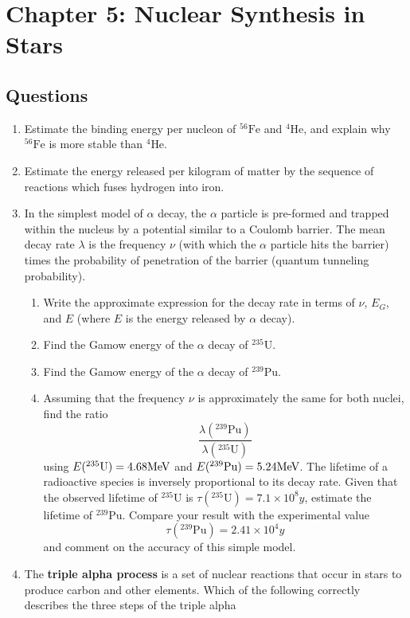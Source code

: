 \section{Chapter 5: Nuclear Synthesis in Stars}

\subsection{Questions}
\begin{enumerate}[label=5.\arabic*]
    \item Estimate the binding energy per nucleon of $^{56}\text{Fe}$ and $^4\text{He}$, and explain why $^{56}\text{Fe}$ is more stable than $^4\text{He}$. 
    \item Estimate the energy released per kilogram of matter by the sequence of reactions which fuses hydrogen into iron.
    \item  In the simplest model of $\alpha$ decay, the $\alpha$ particle is pre-formed and trapped within the nucleus by a potential similar to a Coulomb barrier. The mean decay rate $\lambda$ is the frequency $\nu$ 
    (with which the $\alpha$ particle hits the barrier) times the probability of penetration of the barrier (quantum tunneling probability).
        \begin{enumerate}[label=(\alph*)]
            \item Write the approximate expression for the decay rate in terms of $\nu$, $E_G$, and $E$ (where $E$ is the energy released by $\alpha$ decay).
            \item Find the Gamow energy of the $\alpha$ decay of $^{235}\text{U}$.
            \item Find the Gamow energy of the $\alpha$ decay of $^{239}\text{Pu}$.
            \item Assuming that the frequency $\nu$ is approximately the same for both nuclei, find the ratio
           \[ \frac{\lambda(^{239}\text{Pu})}{\lambda(^{235}\text{U})} \]
           using $E(^{235}\text{U}) = 4.68 \textup{MeV}$ and $E(^{239}\text{Pu}) = 5.24 \textup{MeV}$. The lifetime of a radioactive species is inversely proportional to its decay rate. Given that the observed lifetime of $^{235}\text{U}$ is $\tau (^{235}\text{U}) = 7.1 \times 10^8 y$, estimate the lifetime of $^{239}\text{Pu}$. Compare your result with the experimental value
           \[ \tau (^{239}\text{Pu} ) = 2.41 \times 10^4 y \]
           and comment on the accuracy of this simple model.
        \end{enumerate}
    \item The \textbf{triple alpha process} is a set of nuclear reactions that occur in stars to produce carbon and other elements. Which of the following correctly describes the three steps of the triple alpha

\end{enumerate}
